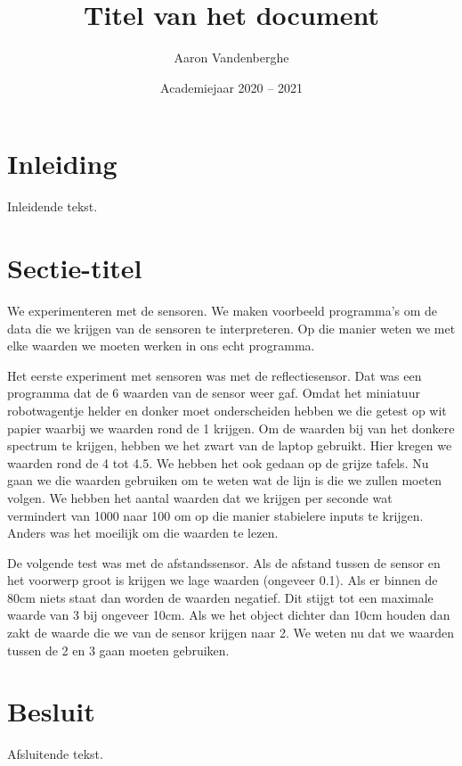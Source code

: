 \documentclass[a4paper,kulak]{kulakarticle} %
\date{Academiejaar 2020 -- 2021}
\title{Titel van het document}
\author{Aaron Vandenberghe}
\begin{document}
\maketitle

\section*{Inleiding}

Inleidende tekst.

\section{Sectie-titel}

We experimenteren met de sensoren. We maken voorbeeld programma's om de data die we krijgen van de sensoren te interpreteren. Op die manier weten we met elke waarden we moeten werken in ons echt programma. 

Het eerste experiment met sensoren was met de reflectiesensor. Dat was een programma dat de 6 waarden van de sensor weer gaf. Omdat het miniatuur robotwagentje helder en donker moet onderscheiden hebben we die getest op wit papier waarbij we waarden rond de 1 krijgen. Om de waarden bij van het donkere spectrum te krijgen, hebben we het zwart van de laptop gebruikt. Hier kregen we waarden rond de 4 tot 4.5. We hebben het ook gedaan op de grijze tafels.
Nu gaan we die waarden gebruiken om te weten wat de lijn is die we zullen moeten volgen.
We hebben het aantal waarden dat we krijgen per seconde wat vermindert van 1000 naar 100 om op die manier stabielere inputs te krijgen. Anders was het moeilijk om die waarden te lezen.


De volgende test was met de afstandssensor. Als de afstand tussen de sensor en het voorwerp groot is krijgen we lage waarden (ongeveer 0.1). Als er binnen de 80cm niets staat dan worden de waarden negatief. Dit stijgt tot een maximale waarde van 3 bij ongeveer 10cm. Als we het object dichter dan 10cm houden dan zakt de waarde die we van de sensor krijgen naar 2. We weten nu dat we waarden tussen de 2 en 3 gaan moeten gebruiken. 

\section*{Besluit}

Afsluitende tekst.
\end{document}
